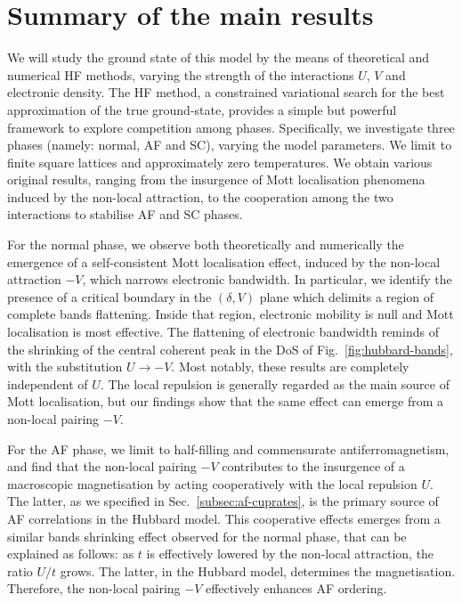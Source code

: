 \section{Summary of the main results}

We will study the ground state of this model by the means of theoretical and numerical HF methods, varying the strength of the interactions $U$, $V$ and electronic density. The HF method, a constrained variational search for the best approximation of the true ground-state, provides a simple but powerful framework to explore competition among phases. Specifically, we investigate three phases (namely: normal, AF and SC), varying the model parameters. We limit to finite square lattices and approximately zero temperatures. We obtain various original results, ranging from the insurgence of Mott localisation phenomena induced by the non-local attraction, to the cooperation among the two interactions to stabilise AF and SC phases.

For the normal phase, we observe both theoretically and numerically the emergence of a self-consistent Mott localisation effect, induced by the non-local attraction $-V$, which narrows electronic bandwidth. In particular, we identify the presence of a critical boundary in the $(\delta,V)$ plane which delimits a region of complete bands flattening. Inside that region, electronic mobility is null and Mott localisation is most effective. The flattening of electronic bandwidth reminds of the shrinking of the central coherent peak in the DoS of Fig.~\ref{fig:hubbard-bands}, with the substitution $U \to -V$. Most notably, these results are completely independent of $U$. The local repulsion is generally regarded as the main source of Mott localisation, but our findings show that the same effect can emerge from a non-local pairing $-V$.

For the AF phase, we limit to half-filling and commensurate antiferromagnetism, and find that the non-local pairing $-V$ contributes to the insurgence of a macroscopic magnetisation by acting cooperatively with the local repulsion $U$. The latter, as we specified in Sec.~\ref{subsec:af-cuprates}, is the primary source of AF correlations in the Hubbard model. This cooperative effects emerges from a similar bands shrinking effect observed for the normal phase, that can be explained as follows: as $t$ is effectively lowered by the non-local attraction, the ratio $U/t$ grows. The latter, in the Hubbard model, determines the magnetisation. Therefore, the non-local pairing $-V$ effectively enhances AF ordering.

